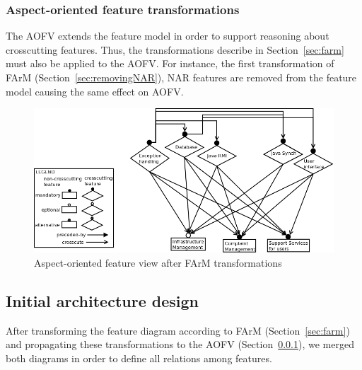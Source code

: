 \documentclass[11pt,twoside]{article}
\begin{document}
\subsubsection{Aspect-oriented feature transformations}
\label{sec:farm-aofv}

The AOFV extends the feature model in order to support reasoning about crosscutting features. Thus, the transformations describe in
Section~\ref{sec:farm} must also be applied to the AOFV. For instance, the first transformation of FArM (Section~\ref{sec:removingNAR}), NAR features
are removed from the feature model causing the same effect on AOFV. 



\begin{figure}[h!t!b!]
   \centering
    \includegraphics[scale=0.3]{figs/aofv-step4-v03.png}
   \caption{Aspect-oriented feature view after FArM transformations}
   \label{fig:aofv-farm-step4}
\end{figure}

\subsection{Initial architecture design}

After transforming the feature diagram according to FArM (Section~\ref{sec:farm}) and propagating these transformations to the AOFV
(Section~\ref{sec:farm-aofv}), we merged both diagrams in order to define all relations among features.
\end{document}
